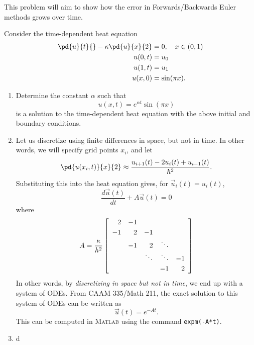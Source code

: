
This problem will aim to show how the error in Forwards/Backwards Euler methods grows over time.  

Consider the time-dependent heat equation
\begin{align*}
\pd{u}{t}{}-\kappa\pd{u}{x}{2} &= 0, \quad x\in (0,1)\\
u(0,t) &= u_0\\
u(1,t) &= u_1\\
u(x,0) &= \sin(\pi x).
\end{align*}

\begin{enumerate}
\item Determine the constant $\alpha$ such that
\[
u(x,t) = e^{\alpha t}\sin(\pi x)
\]
is a solution to the time-dependent heat equation with the above initial and boundary conditions.  %
\item Let us discretize using finite differences in space, but not in time.  In other words, we will specify grid points $x_i$, and let
\[
\pd{u(x_i,t)}{x}{2} \approx \frac{u_{i+1}(t) - 2u_i(t) + u_{i-1}(t)}{h^2}.
\]
Substituting this into the heat equation gives, for $\vec{u}_i(t) = u_i(t)$,
\[
\frac{d \vec{u}(t)}{dt} + A\vec{u}(t) = 0
\]
where
\[
A = {\kappa\over h^2} \left[\begin{array}{rrrrr}
              2 & -1 \\[0.25em]
               -1 & 2 & -1 \\
                 &  -1  & 2 & \ddots \\
                 & & \ddots & \ddots & -1 \\[0.25em]
                 & & & -1 & 2 
               \end{array}\right]
\]
In other words, by \emph{discretizing in space but not in time}, we end up with a system of ODEs.  From CAAM 335/Math 211, the exact solution to this system of ODEs can be written as
\[
\vec{u}(t) = e^{-At}.
\]
This can be computed in \textsc{Matlab} using the command \verb+expm(-A*t)+.
\item d
\end{enumerate}




